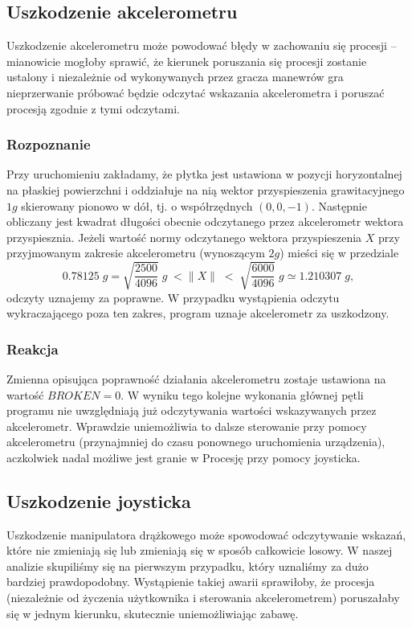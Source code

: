 \documentclass[a4paper,12pt,twoside]{article}
\theoremstyle{plain}
\theoremstyle{definition}
\theoremstyle{remark}
\begin{document}
	\subsection{Uszkodzenie akcelerometru}
	Uszkodzenie akcelerometru może powodować błędy w zachowaniu się procesji -- mianowicie mogłoby sprawić, że kierunek poruszania się procesji zostanie ustalony i niezależnie od wykonywanych przez gracza manewrów gra nieprzerwanie próbować będzie odczytać wskazania akcelerometra i poruszać procesją zgodnie z tymi odczytami.
	\subsubsection{Rozpoznanie}
	Przy uruchomieniu zakładamy, że płytka jest ustawiona w pozycji horyzontalnej na płaskiej powierzchni i oddziałuje na nią wektor przyspieszenia grawitacyjnego $1g$ skierowany pionowo w dół, tj. o współrzędnych $(0,0,-1)$. Następnie obliczany jest kwadrat długości obecnie odczytanego przez akcelerometr wektora przyspiesznia. Jeżeli wartość normy odczytanego wektora przyspieszenia $X$ przy przyjmowanym zakresie akcelerometru (wynoszącym $2g$) mieści się w przedziale
	$$0.78125\;g =\sqrt{ \frac{2500}{4096} }\; g \; < \| X \| \; < \; \sqrt{ \frac{6000}{4096} }\; g \simeq 1.210307\; g ,$$
	odczyty uznajemy za poprawne. W przypadku wystąpienia odczytu wykraczającego poza ten zakres, program uznaje akcelerometr za uszkodzony.
	\subsubsection{Reakcja}
	Zmienna opisująca poprawność działania akcelerometru zostaje ustawiona na wartość $BROKEN = 0$. W wyniku tego kolejne wykonania głównej pętli programu nie uwzględniają już odczytywania wartości wskazywanych przez akcelerometr. Wprawdzie uniemożliwia to dalsze sterowanie przy pomocy akcelerometru (przynajmniej do czasu ponownego uruchomienia urządzenia), aczkolwiek nadal możliwe jest granie w Procesję przy pomocy joysticka.
	\subsection{Uszkodzenie joysticka}
	Uszkodzenie manipulatora drążkowego może spowodować odczytywanie wskazań, które nie zmieniają się lub zmieniają się w sposób całkowicie losowy. W naszej analizie skupiliśmy się na pierwszym przypadku, który uznaliśmy za dużo bardziej prawdopodobny. Wystąpienie takiej awarii sprawiłoby, że procesja (niezależnie od życzenia użytkownika i sterowania akcelerometrem) poruszałaby się w jednym kierunku, skutecznie uniemożliwiając zabawę.
\end{document}
